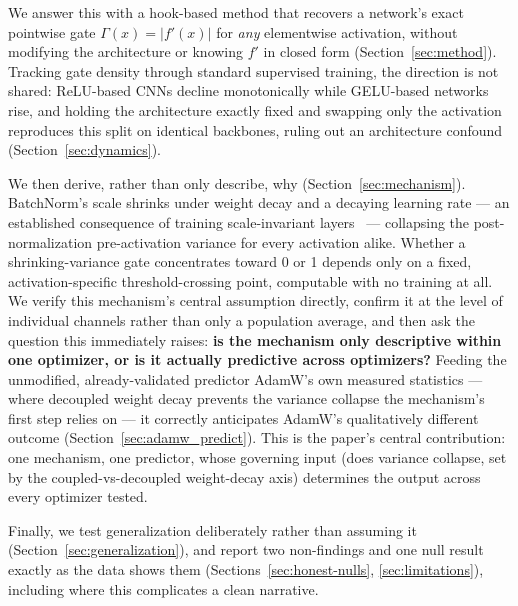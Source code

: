\documentclass{article}
\begin{document}
We answer this with a hook-based method that recovers a network's exact pointwise gate $\Gamma(x) = |f'(x)|$ for \emph{any} elementwise activation, without modifying the architecture or knowing $f'$ in closed form (Section~\ref{sec:method}). Tracking gate density through standard supervised training, the direction is not shared: ReLU-based CNNs decline monotonically while GELU-based networks rise, and holding the architecture exactly fixed and swapping only the activation reproduces this split on identical backbones, ruling out an architecture confound (Section~\ref{sec:dynamics}).

We then derive, rather than only describe, why (Section~\ref{sec:mechanism}). BatchNorm's scale shrinks under weight decay and a decaying learning rate --- an established consequence of training scale-invariant layers~\citep{vanlaarhoven2017l2,hoffer2018norm} --- collapsing the post-normalization pre-activation variance for every activation alike. Whether a shrinking-variance gate concentrates toward 0 or 1 depends only on a fixed, activation-specific threshold-crossing point, computable with no training at all. We verify this mechanism's central assumption directly, confirm it at the level of individual channels rather than only a population average, and then ask the question this immediately raises: \textbf{is the mechanism only descriptive within one optimizer, or is it actually predictive across optimizers?} Feeding the unmodified, already-validated predictor AdamW's own measured statistics --- where decoupled weight decay prevents the variance collapse the mechanism's first step relies on --- it correctly anticipates AdamW's qualitatively different outcome (Section~\ref{sec:adamw_predict}). This is the paper's central contribution: one mechanism, one predictor, whose governing input (does variance collapse, set by the coupled-vs-decoupled weight-decay axis) determines the output across every optimizer tested.

Finally, we test generalization deliberately rather than assuming it (Section~\ref{sec:generalization}), and report two non-findings and one null result exactly as the data shows them (Sections~\ref{sec:honest-nulls}, \ref{sec:limitations}), including where this complicates a clean narrative.
\end{document}
